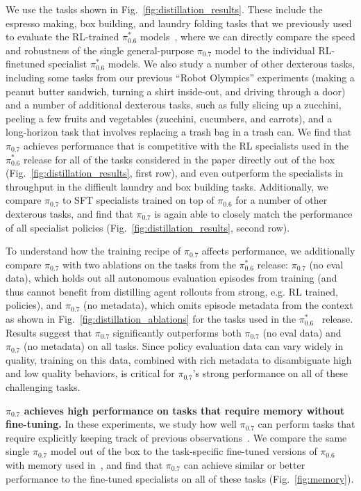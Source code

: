 \documentclass[conference]{IEEEtran}
\def \Pizs {$\pi_{0.6}$}
\def \Piszs {$\pi^{*}_{0.6}$}
\def \MethodName {$\pi_{0.7}$}
\begin{document}
We use the tasks shown in Fig.~\ref{fig:distillation_results}. These include the espresso making, box building, and laundry folding tasks that we previously used to evaluate the RL-trained \Piszs{} models~\citep{pistar06}, where we can directly compare the speed and robustness of the single general-purpose \MethodName{} model to the individual RL-finetuned specialist \Piszs{} models. We also study a number of other dexterous tasks, including some tasks from our previous ``Robot Olympics'' experiments (making a peanut butter sandwich, turning a shirt inside-out, and driving through a door) and a number of additional dexterous tasks, such as fully slicing up a zucchini, peeling a few fruits and vegetables (zucchini, cucumbers, and carrots), and a long-horizon task that involves replacing a trash bag in a trash can. We find that \MethodName{} achieves performance that is competitive with the RL specialists used in the \Piszs{} release \citep{pistar06} for all of the tasks considered in the paper directly out of the box (Fig.~\ref{fig:distillation_results}, first row), and even outperform the specialists in throughput in the difficult laundry and box building tasks. Additionally, we compare \MethodName{} to SFT specialists trained on top of \Pizs{} for a number of other dexterous tasks, and find that \MethodName{} is again able to closely match the performance of all specialist policies (Fig.~\ref{fig:distillation_results}, second row).

To understand how the training recipe of \MethodName{} affects performance, we additionally compare \MethodName{} with two ablations on the tasks from the \Piszs{} release: \MethodName{} (no eval data), which holds out all autonomous evaluation episodes from training (and thus cannot benefit from distilling agent rollouts from strong, e.g. RL trained, policies), and \MethodName{} (no metadata), which omits episode metadata from the context as shown in Fig.~\ref{fig:distillation_ablations} for the tasks used in the \Piszs~ release. Results suggest that \MethodName{} significantly outperforms both \MethodName{} (no eval data) and \MethodName{} (no metadata) on all tasks. Since policy evaluation data can vary widely in quality, training on this data, combined with rich metadata to disambiguate high and low quality behaviors, is critical for \MethodName{}'s strong performance on all of these challenging tasks.

\noindent \textbf{\MethodName{} achieves high performance on tasks that require memory without fine-tuning.}
In these experiments, we study how well \MethodName{} can perform tasks that require explicitly keeping track of previous observations~\citep{torne2026mem}. 
We compare the same single \MethodName{} model out of the box to the task-specific fine-tuned versions of \Pizs{} with memory used in~\citet{torne2026mem}, and find that \MethodName{} can achieve similar or better performance to the fine-tuned specialists on all of these tasks (Fig.~\ref{fig:memory}).
\end{document}
